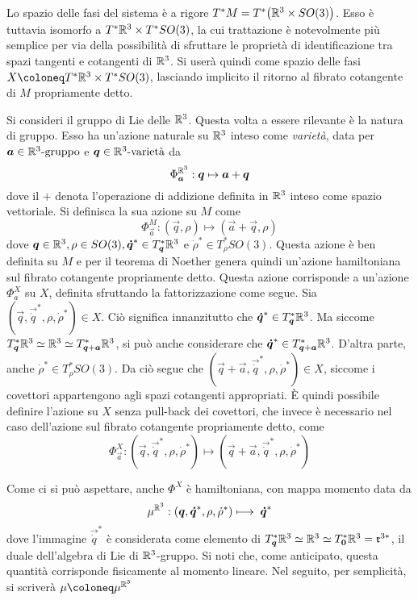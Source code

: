 Lo spazio delle fasi del sistema è a rigore $T^*M = T^*\big(\mathbb{R}^3 \times SO(3)\big)$. Esso è tuttavia isomorfo a $T^*\mathbb{R}^3 \times T^*SO(3)$, la cui trattazione è notevolmente più semplice per via della possibilità di sfruttare le proprietà di identificazione tra spazi tangenti e cotangenti di $\mathbb{R}^3$. Si userà quindi come spazio delle fasi $X \defeq T^*\R^3 \times T^*SO(3)$, lasciando implicito il ritorno al fibrato cotangente di $M$ propriamente detto.

Si consideri il gruppo di Lie delle  $\mathbb{R}^3$. Questa volta a essere rilevante è la natura di gruppo. Esso ha un'azione naturale su $\mathbb{R}^3$ inteso come \emph{varietà}, data per $\boldsymbol{a} \in \mathbb{R}^3\text{-gruppo}$ e $\boldsymbol{q} \in \mathbb{R}^3\text{-varietà}$ da
\begin{equation}
\Phi_{\boldsymbol{a}}^{\mathbb{R}^3}: \boldsymbol{q} \mapsto  \boldsymbol{a} + \boldsymbol{q}
\end{equation}
dove il $+$ denota l'operazione di addizione definita in $\mathbb{R}^3$ inteso come spazio vettoriale. Si definisca la sua azione su $M$ come 
\begin{equation}
  \Phi_{\vec{a}}^M: (\vec{q},\rho) \longmapsto (\vec{a} + \vec{q},\rho)
\end{equation}
dove $\boldsymbol{q} \in \mathbb{R}^3, \rho \in SO(3), \boldsymbol{\dot{q}}^* \in T^*_{\boldsymbol{q}}\mathbb{R}^3$ e $\dot{\rho}^* \in T^*_{\rho}SO(3)$. Questa azione è ben definita su $M$ e per il teorema di Noether genera quindi un'azione hamiltoniana sul fibrato cotangente propriamente detto. Questa azione corrisponde a un'azione $\Phi^X_a$ su $X$, definita sfruttando la fattorizzazione come segue. Sia $(\vec{q},\vec{\dot{q}}^*, \rho, \dot{\rho}^*) \in X$. Ciò significa innanzitutto che $\boldsymbol{\dot{q}}^* \in T^*_{\boldsymbol{q}}\mathbb{R}^3$. Ma siccome $T^*_{\boldsymbol{q}}\mathbb{R}^3 \simeq \mathbb{R}^3 \simeq T^*_{\boldsymbol{q}+\boldsymbol{a}}\mathbb{R}^3$, si può anche considerare che $\boldsymbol{\dot{q}}^* \in T^*_{\boldsymbol{q}+\boldsymbol{a}}\mathbb{R}^3$. D'altra parte, anche $\dot{\rho}^* \in  T^*_{\rho}SO(3)$. Da ciò segue che $(\vec{q} +\vec{a},\vec{\dot{q}}^*, \rho, \dot{\rho}^*) \in X$, siccome i covettori appartengono agli spazi cotangenti appropriati. È quindi possibile definire l'azione su $X$ senza pull-back dei covettori, che invece è necessario nel caso dell'azione sul fibrato cotangente propriamente detto, come 
\begin{equation}
\Phi^X_{\vec{a}}: (\vec{q},\vec{\dot{q}}^*, \rho, \dot{\rho}^*) \longmapsto (\vec{q}+ \vec{a},\vec{\dot{q}}^*, \rho, \dot{\rho}^*) 
\end{equation}  

Come ci si può aspettare, anche $\Phi^X$ è hamiltoniana, con mappa momento data da
\begin{equation}
\mu^{\mathbb{R}^3}: (\boldsymbol{q}, \boldsymbol{\dot{q}}^*, \rho, \dot{\rho}^*) \longmapsto\; \boldsymbol{\dot{q}}^*
\end{equation} 
dove l'immagine $\vec{\dot{q}}^*$ è considerata come elemento di $T^*_{\boldsymbol{q}}\mathbb{R}^3 \simeq \mathbb{R}^3 \simeq T^*_{\boldsymbol{0}}\mathbb{R}^3 = \mathfrak{r}^{3*}$, il duale dell'algebra di Lie di $\mathbb{R}^3$-gruppo. Si noti che, come anticipato, questa quantità corrisponde fisicamente al momento lineare. Nel seguito, per semplicità, si scriverà $\mu \defeq \mu^{\R^3}$

